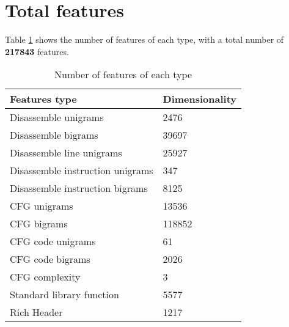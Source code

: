 \section{Total features}
Table \ref{tab:num_feat} shows the number of features of each type, with a total number of \textbf{217843} features.

\begin{table}[!htb]
		\centering
		\caption{Number of features of each type}
		\label{tab:num_feat}
			\begin{tabular}{ll}
				\toprule
				Features type                    & Dimensionality \\
				\midrule
				Disassemble unigrams             & 2476           \\ 
				Disassemble bigrams              & 39697          \\ 
				Disassemble line unigrams        & 25927          \\ 
				Disassemble instruction unigrams & 347            \\ 
				Disassemble instruction bigrams  & 8125           \\ 
				CFG unigrams                     & 13536          \\ 
				CFG bigrams                      & 118852         \\ 
				CFG code unigrams                & 61             \\ 
				CFG code bigrams                 & 2026           \\ 
				CFG complexity                   & 3              \\ 
				Standard library function        & 5577           \\ 
				Rich Header & 1217           \\ 
				\bottomrule
			\end{tabular}
		
\end{table}

